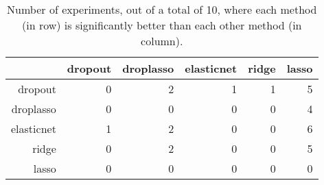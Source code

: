\begin{table}[ht]
\centering
\begin{tabular}{rrrrrr}
  \hline
 & dropout & droplasso & elasticnet & ridge & lasso \\ 
  \hline
dropout &   0 &   2 &   1 &   1 &   5 \\ 
  droplasso &   0 &   0 &   0 &   0 &   4 \\ 
  elasticnet &   1 &   2 &   0 &   0 &   6 \\ 
  ridge &   0 &   2 &   0 &   0 &   5 \\ 
  lasso &   0 &   0 &   0 &   0 &   0 \\ 
   \hline
\end{tabular}
\caption{Number of experiments, out of a total of 10, where each method (in row) is significantly better than each other method (in column).} 
\end{table}
